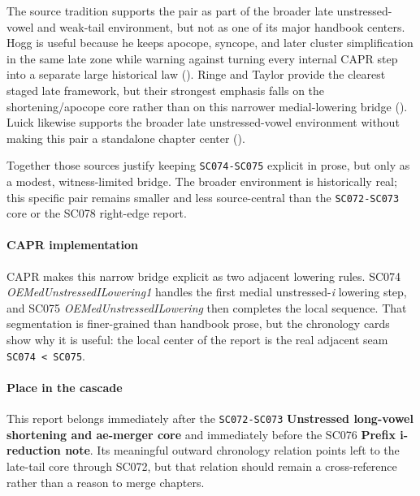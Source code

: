 \documentclass[
  british,
  a4paper,
]{article}
\begin{document}
The source tradition supports the pair as part of the broader late
unstressed-vowel and weak-tail environment, but not as one of its major
handbook centers. Hogg is useful because he keeps apocope, syncope, and
later cluster simplification in the same late zone while warning against
turning every internal CAPR step into a separate large historical law
(). Ringe and Taylor provide
the clearest staged late framework, but their strongest emphasis falls
on the shortening/apocope core rather than on this narrower
medial-lowering bridge (). Luick likewise supports the
broader late unstressed-vowel environment without making this pair a
standalone chapter center ().

Together those sources justify keeping \texttt{SC074-SC075} explicit in
prose, but only as a modest, witness-limited bridge. The broader
environment is historically real; this specific pair remains smaller and
less source-central than the \texttt{SC072-SC073} core or the SC078
right-edge report.

\paragraph{CAPR implementation}\label{capr-implementation-46}

CAPR makes this narrow bridge explicit as two adjacent lowering rules.
SC074 \emph{OEMedUnstressedILowering1} handles the first medial
unstressed-\emph{i} lowering step, and SC075
\emph{OEMedUnstressedILowering} then completes the local sequence. That
segmentation is finer-grained than handbook prose, but the chronology
cards show why it is useful: the local center of the report is the real
adjacent seam \texttt{SC074\ \textless{}\ SC075}.

\paragraph{Place in the cascade}\label{place-in-the-cascade-46}

This report belongs immediately after the \texttt{SC072-SC073}
\textbf{Unstressed long-vowel shortening and ae-merger core} and
immediately before the SC076 \textbf{Prefix i-reduction note}. Its
meaningful outward chronology relation points left to the late-tail core
through SC072, but that relation should remain a cross-reference rather
than a reason to merge chapters.
\end{document}
